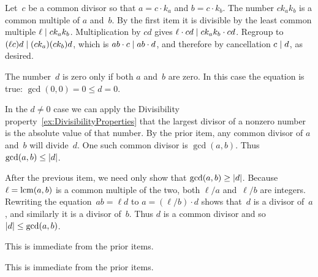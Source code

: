 \documentclass{ibl}
\begin{document}
\begin{ex}
\begin{ans}
\begin{exes}
  Let~$c$ be a common divisor so that $a=c\cdot k_a$ and $b=c\cdot k_b$.
  The number $ck_ak_b$ is a common multiple of $a$ and~$b$. 
  By the first item it is divisible by the least common multiple  
  $\ell\mid ck_ak_b$.
  Multiplication by $cd$ gives $\ell\cdot cd\mid ck_ak_b\cdot cd$.
  Regroup to $(\ell c)d\mid (ck_a)(ck_b)d$, which is
  $ab\cdot c\mid ab\cdot d$, and therefore by cancellation $c\mid d$,
  as desired.
\item The number~$d$ is zero only if both $a$ and~$b$ are
  zero.
  In this case the equation is true: $\gcd(0,0)=0\leq d=0$.

  In the $d\neq 0$ case we can apply the 
  Divisibility property~\ref{ex:DivisibilityProperties} that the
  largest divisor of a nonzero number is the absolute value of that number.
  By the prior item, any common divisor of $a$ and~$b$ will divide~$d$.
  One such common divisor is $\gcd(a,b)$.
  Thus $\gcd(a,b)\leq\lvert d\rvert$.
\item
  After the previous item, we need only show that $\gcd(a,b)\geq\lvert d\rvert$. 
  Because $\ell=\operatorname{lcm}(a,b)$ is a common multiple of the two, 
  both $\ell/a$ and~$\ell/b$ are integers. 
  Rewriting the equation~$ab=\ell d$ to 
  $a=(\ell/b)\cdot d$ shows that~$d$ is a divisor of~$a$, and similarly
  it is a divisor of~$b$.
  Thus $d$ is a common divisor and so $\lvert d\rvert\leq \gcd(a,b)$.
\item This is immediate from the prior items.
\item This is immediate from the prior items.
  

  

\end{exes}
\end{ans}
\end{ex}
\end{document}
